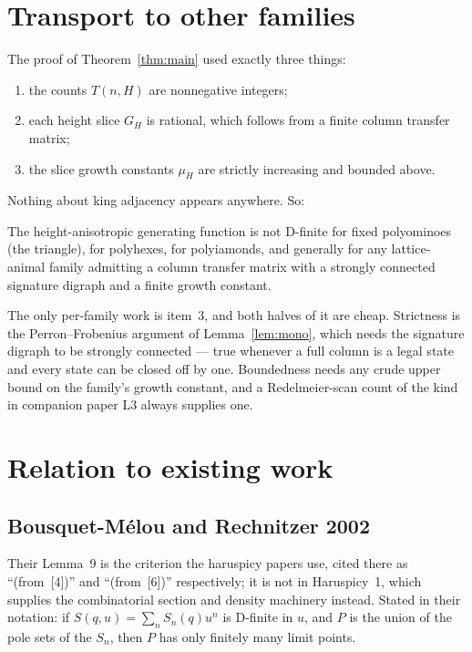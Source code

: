 \documentclass[11pt]{article}
\begin{document}
\section{Transport to other families}
\label{sec:transport}

The proof of Theorem~\ref{thm:main} used exactly three things:

\begin{enumerate}
\item the counts $T(n,H)$ are nonnegative integers;
\item each height slice $G_H$ is rational, which follows from a finite column
  transfer matrix;
\item the slice growth constants $\mu_H$ are strictly increasing and bounded
  above.
\end{enumerate}

Nothing about king adjacency appears anywhere. So:

\begin{corollary}
\label{cor:transport}
The height-anisotropic generating function is not D-finite for fixed polyominoes
(the  triangle), for polyhexes, for polyiamonds, and generally for
any lattice-animal family admitting a column transfer matrix with a strongly
connected signature digraph and a finite growth constant.
\end{corollary}

The only per-family work is item~3, and both halves of it are cheap. Strictness
is the Perron--Frobenius argument of Lemma~\ref{lem:mono}, which needs the
signature digraph to be strongly connected --- true whenever a full column is a
legal state and every state can be closed off by one. Boundedness needs any crude upper bound on the family's growth constant, and a
Redelmeier-scan count of the kind in companion paper L3 always supplies one.

\section{Relation to existing work}
\label{sec:related}

\subsection{Bousquet-M\'elou and Rechnitzer 2002}

Their Lemma~9 is the criterion the haruspicy papers use, cited there
as ``(from~[4])'' and ``(from~[6])'' respectively; it is not in Haruspicy~1,
which supplies the combinatorial section and density machinery instead. Stated in
their notation: if $S(q,u) = \sum_n S_n(q)u^n$ is D-finite in $u$, and $P$ is the
union of the pole sets of the $S_n$, then $P$ has only finitely many limit points.
\end{document}
